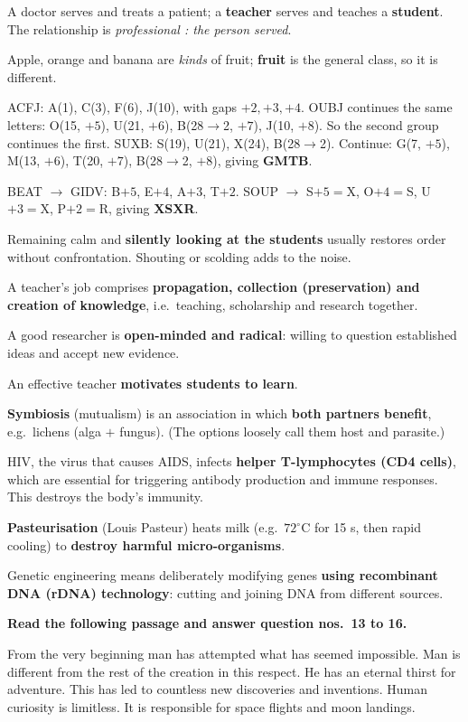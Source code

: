 A doctor serves and treats a patient; a \textbf{teacher} serves and teaches a \textbf{student}. The relationship is \emph{professional : the person served}.

Apple, orange and banana are \emph{kinds} of fruit; \textbf{fruit} is the general class, so it is different.

ACFJ: A(1), C(3), F(6), J(10), with gaps $+2, +3, +4$. OUBJ continues the same letters: O(15, $+5$), U(21, $+6$), B(28$\to$2, $+7$), J(10, $+8$). So the second group continues the first.
SUXB: S(19), U(21), X(24), B(28$\to$2). Continue: G(7, $+5$), M(13, $+6$), T(20, $+7$), B(28$\to$2, $+8$), giving \textbf{GMTB}.

BEAT $\rightarrow$ GIDV: B$+5$, E$+4$, A$+3$, T$+2$.
SOUP $\rightarrow$ S$+5=$X, O$+4=$S, U$+3=$X, P$+2=$R, giving \textbf{XSXR}.

Remaining calm and \textbf{silently looking at the students} usually restores order without confrontation. Shouting or scolding adds to the noise.

A teacher's job comprises \textbf{propagation, collection (preservation) and creation of knowledge}, i.e.\ teaching, scholarship and research together.

A good researcher is \textbf{open-minded and radical}: willing to question established ideas and accept new evidence.

An effective teacher \textbf{motivates students to learn}.

\textbf{Symbiosis} (mutualism) is an association in which \textbf{both partners benefit}, e.g.\ lichens (alga $+$ fungus). (The options loosely call them host and parasite.)

HIV, the virus that causes AIDS, infects \textbf{helper T-lymphocytes (CD4 cells)}, which are essential for triggering antibody production and immune responses. This destroys the body's immunity.

\textbf{Pasteurisation} (Louis Pasteur) heats milk (e.g.\ $72^\circ$C for 15 s, then rapid cooling) to \textbf{destroy harmful micro-organisms}.

Genetic engineering means deliberately modifying genes \textbf{using recombinant DNA (rDNA) technology}: cutting and joining DNA from different sources.

\textbf{Read the following passage and answer question nos.~13 to 16.}\par\smallskip
From the very beginning man has attempted what has seemed impossible. Man is different from the rest of the creation in this respect. He has an eternal thirst for adventure. This has led to countless new discoveries and inventions. Human curiosity is limitless. It is responsible for space flights and moon landings.


